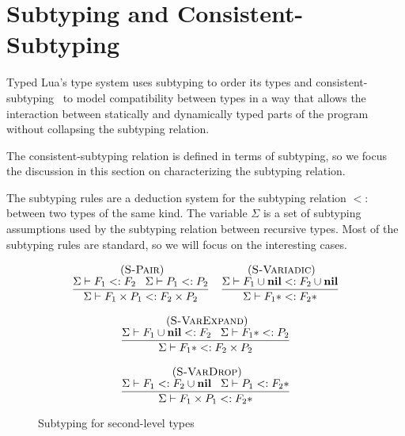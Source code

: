 \documentclass[10pt]{sigplanconf}
\newcommand{\Nil}{\mathbf{nil}}
\newcommand{\mylabel}[1]{\; (\textsc{#1})}
\newcommand{\senv}{\Sigma}
\newcommand{\subtype}{<:}
\begin{document}
\section{Subtyping and Consistent-Subtyping}
\label{sec:subtyping}

Typed Lua's type system uses subtyping to order
its types and  consistent-subtyping~\cite{siek2007objects,siek2013mutable}
to model compatibility between types in a way that allows
the interaction between statically and dynamically typed
parts of the program without collapsing the subtyping
relation.

The consistent-subtyping relation is defined in terms
of subtyping, so we focus the discussion in this section
on characterizing the subtyping relation.

The subtyping rules are a deduction system for the
subtyping relation $\subtype$ between two types of the
same kind.
The variable $\senv$ is a set of subtyping assumptions used
by the subtyping relation between recursive types. 
Most of the subtyping rules are standard, so we will
focus on the interesting cases.

\begin{figure}[t]
{\footnotesize
\[
\begin{array}{c}
\begin{array}{c}
\mylabel{S-Pair}\\
\dfrac{\senv \vdash F_{1} \subtype F_{2} \;\;\;
	\senv \vdash P_{1} \subtype P_{2}}
{\senv \vdash F_{1} \times P_{1} \subtype F_{2} \times P_{2}}
\end{array}
\begin{array}{c}
\mylabel{S-Variadic}\\
\dfrac{\senv \vdash F_{1} \cup \Nil \subtype F_{2} \cup \Nil}
{\senv \vdash F_{1}{*} \subtype F_{2}{*}}
\end{array}\\\\
\begin{array}{c}
\mylabel{S-VarExpand}\\
\dfrac{\senv \vdash F_{1} \cup \Nil \subtype F_{2} \;\;\;
	\senv \vdash F_{1}{*} \subtype P_{2}}
{\senv \vdash F_{1}{*} \subtype F_{2} \times P_{2}}
\end{array}
\\ \\
\begin{array}{c}
\mylabel{S-VarDrop}\\
\dfrac{\senv \vdash F_{1} \subtype F_{2} \cup \Nil \;\;\;
	\senv \vdash P_{1} \subtype F_{2}{*}}
{\senv \vdash F_{1} \times P_{1} \subtype F_{2}{*}}
\end{array}
\end{array}
\]
}
\caption{Subtyping for second-level types}	
\label{fig:subtuples}
\end{figure}
\end{document}
